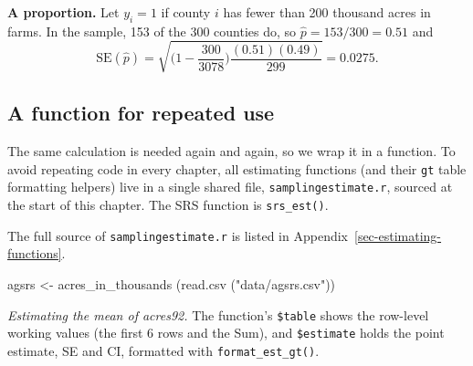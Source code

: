 \documentclass[
  letterpaper,
  DIV=11,
  numbers=noendperiod]{scrreprt}
\newenvironment{Shaded}{\begin{snugshade}}{\end{snugshade}}
\newcommand{\AttributeTok}[1]{\textcolor[rgb]{0.40,0.45,0.13}{#1}}
\newcommand{\DecValTok}[1]{\textcolor[rgb]{0.68,0.00,0.00}{#1}}
\newcommand{\FunctionTok}[1]{\textcolor[rgb]{0.28,0.35,0.67}{#1}}
\newcommand{\NormalTok}[1]{\textcolor[rgb]{0.00,0.23,0.31}{#1}}
\newcommand{\OtherTok}[1]{\textcolor[rgb]{0.00,0.23,0.31}{#1}}
\newcommand{\SpecialCharTok}[1]{\textcolor[rgb]{0.37,0.37,0.37}{#1}}
\newcommand{\StringTok}[1]{\textcolor[rgb]{0.13,0.47,0.30}{#1}}
\renewcommand{\[}{\begin{equation}}
\renewcommand{\]}{\end{equation}}
\begin{document}
\textbf{A proportion.} Let \(y_i = 1\) if county \(i\) has fewer than
200 thousand acres in farms. In the sample, 153 of the 300 counties do,
so \(\hat p = 153/300 = 0.51\) and \[
\mathrm{SE}(\hat p) = \sqrt{\Big(1-\frac{300}{3078}\Big)\frac{(0.51)(0.49)}{299}} = 0.0275 .
\]

\subsection{A function for repeated
use}\label{a-function-for-repeated-use}

The same calculation is needed again and again, so we wrap it in a
function. To avoid repeating code in every chapter, all estimating
functions (and their \texttt{gt} table formatting helpers) live in a
single shared file, \texttt{samplingestimate.r}, sourced at the start of
this chapter. The SRS function is \texttt{srs\_est()}.

The full source of \texttt{samplingestimate.r} is listed in
Appendix~\ref{sec-estimating-functions}.

\begin{Shaded}
\begin{Highlighting}[]
\NormalTok{agsrs }\OtherTok{\textless{}{-}} \FunctionTok{acres\_in\_thousands}\NormalTok{ (}\FunctionTok{read.csv}\NormalTok{ (}\StringTok{"data/agsrs.csv"}\NormalTok{))}
\end{Highlighting}
\end{Shaded}

\emph{Estimating the mean of acres92.} The function's \texttt{\$table}
shows the row-level working values (the first 6 rows and the Sum), and
\texttt{\$estimate} holds the point estimate, SE and CI, formatted with
\texttt{format\_est\_gt()}.

\begin{Shaded}
\end{Shaded}
\end{document}
